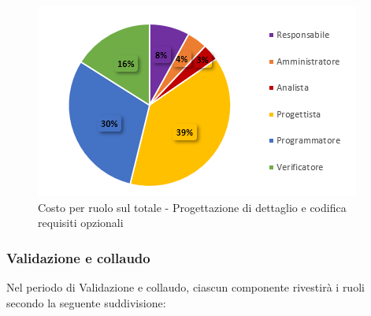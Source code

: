      \begin{figure}[H]
       \centering
        \includegraphics[scale=0.9]{immagini/costo_ruolo_reqOpzionali.png}
        \caption{Costo per ruolo sul totale - Progettazione di dettaglio e codifica requisiti opzionali}
      \end{figure}
   

\subsubsection{Validazione e collaudo}
Nel periodo di Validazione e collaudo, ciascun componente rivestirà i ruoli secondo la seguente suddivisione:
   
